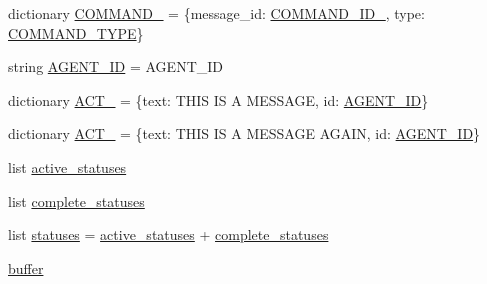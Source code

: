 \begin{DoxyCompactItemize}
dictionary \hyperlink{namespaceparlai_1_1mturk_1_1core_1_1dev_1_1test_1_1test__mturk__agent_a7572b51d7c7c0b5e5267a5222b2d9444}{C\+O\+M\+M\+A\+N\+D\+\_} = \{\textquotesingle{}message\+\_\+id\textquotesingle{}\+: \hyperlink{namespaceparlai_1_1mturk_1_1core_1_1dev_1_1test_1_1test__mturk__agent_afc8f97a07751ffff2f19873ff90b8f4c}{C\+O\+M\+M\+A\+N\+D\+\_\+\+I\+D\+\_}, \textquotesingle{}type\textquotesingle{}\+: \hyperlink{namespaceparlai_1_1mturk_1_1core_1_1dev_1_1test_1_1test__mturk__agent_a7e6fc885aa8009129bfb1fd046489ac3}{C\+O\+M\+M\+A\+N\+D\+\_\+\+T\+Y\+PE}\}
\item 
string \hyperlink{namespaceparlai_1_1mturk_1_1core_1_1dev_1_1test_1_1test__mturk__agent_a863ed95714a388df17eef58f84cf5840}{A\+G\+E\+N\+T\+\_\+\+ID} = \textquotesingle{}A\+G\+E\+N\+T\+\_\+\+ID\textquotesingle{}
\item 
dictionary \hyperlink{namespaceparlai_1_1mturk_1_1core_1_1dev_1_1test_1_1test__mturk__agent_ab73d0d4d02aaeba87f6b3be614b29dad}{A\+C\+T\+\_} = \{\textquotesingle{}text\textquotesingle{}\+: \textquotesingle{}T\+H\+IS IS A M\+E\+S\+S\+A\+GE\textquotesingle{}, \textquotesingle{}id\textquotesingle{}\+: \hyperlink{namespaceparlai_1_1mturk_1_1core_1_1dev_1_1test_1_1test__mturk__agent_a863ed95714a388df17eef58f84cf5840}{A\+G\+E\+N\+T\+\_\+\+ID}\}
\item 
dictionary \hyperlink{namespaceparlai_1_1mturk_1_1core_1_1dev_1_1test_1_1test__mturk__agent_a461816f9e67c59df5d2bb41c407927d3}{A\+C\+T\+\_} = \{\textquotesingle{}text\textquotesingle{}\+: \textquotesingle{}T\+H\+IS IS A M\+E\+S\+S\+A\+GE A\+G\+A\+IN\textquotesingle{}, \textquotesingle{}id\textquotesingle{}\+: \hyperlink{namespaceparlai_1_1mturk_1_1core_1_1dev_1_1test_1_1test__mturk__agent_a863ed95714a388df17eef58f84cf5840}{A\+G\+E\+N\+T\+\_\+\+ID}\}
\item 
list \hyperlink{namespaceparlai_1_1mturk_1_1core_1_1dev_1_1test_1_1test__mturk__agent_a47c96435a7b14b60e95d5b2238d56031}{active\+\_\+statuses}
\item 
list \hyperlink{namespaceparlai_1_1mturk_1_1core_1_1dev_1_1test_1_1test__mturk__agent_a7a8cf576b9f4e42ae4a1d46bcd086bdb}{complete\+\_\+statuses}
\item 
list \hyperlink{namespaceparlai_1_1mturk_1_1core_1_1dev_1_1test_1_1test__mturk__agent_a4d17b8e7985aa0777bfc8501b4af4bf6}{statuses} = \hyperlink{namespaceparlai_1_1mturk_1_1core_1_1dev_1_1test_1_1test__mturk__agent_a47c96435a7b14b60e95d5b2238d56031}{active\+\_\+statuses} + \hyperlink{namespaceparlai_1_1mturk_1_1core_1_1dev_1_1test_1_1test__mturk__agent_a7a8cf576b9f4e42ae4a1d46bcd086bdb}{complete\+\_\+statuses}
\item 
\hyperlink{namespaceparlai_1_1mturk_1_1core_1_1dev_1_1test_1_1test__mturk__agent_ac6aecad8f2e5240457f367be12f6f388}{buffer}
\end{DoxyCompactItemize}


